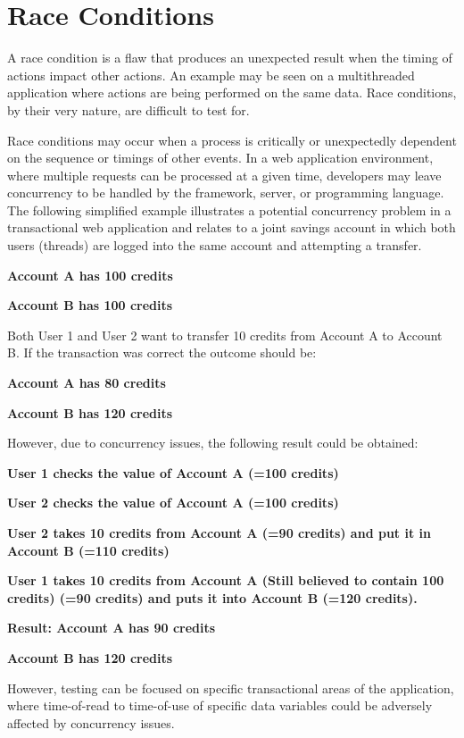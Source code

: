\section{Race Conditions}

	A race condition is a flaw that produces an unexpected result when the timing of actions impact 
	other actions. An example may be seen on a multithreaded application where actions are being 
	performed on the same data. Race conditions, by their very nature, are difficult to test for.

	Race conditions may occur when a process is critically or unexpectedly dependent on the sequence 
	or timings of other events. In a web application environment, where multiple requests can be 
	processed at a given time, developers may leave concurrency to be handled by the framework, 
	server, or programming language. The following simplified example illustrates a potential 
	concurrency problem in a transactional web application and relates to a joint savings account 
	in which both users (threads) are logged into the same account and attempting a transfer.

	{\bf \color{red} Account A has 100 credits}

	{\bf \color{blue} Account B has 100 credits}

	Both User 1 and User 2 want to transfer 10 credits from Account A to Account B. If the 
	transaction was correct the outcome should be:

	{\bf \color{red} Account A has 80 credits}

	{\bf \color{blue} Account B has 120 credits}

	However, due to concurrency issues, the following result could be obtained:

	{\bf User 1 checks the value of Account A (=100 credits)}

	{\bf User 2 checks the value of Account A (=100 credits)}

	{\bf User 2 takes 10 credits from Account A (=90 credits) and put it in Account B (=110 credits)}

	{\bf User 1 takes 10 credits from Account A (Still believed to contain 100 credits) 
	(=90 credits) and puts it into Account B (=120 credits).}

	{\bf \color{red} Result: Account A has 90 credits}
	
	{\bf \color{blue} Account B has 120 credits}

	However, testing can be focused on specific transactional areas of the application, where 
	time-of-read to time-of-use of specific data variables could be adversely affected by concurrency 
	issues.


